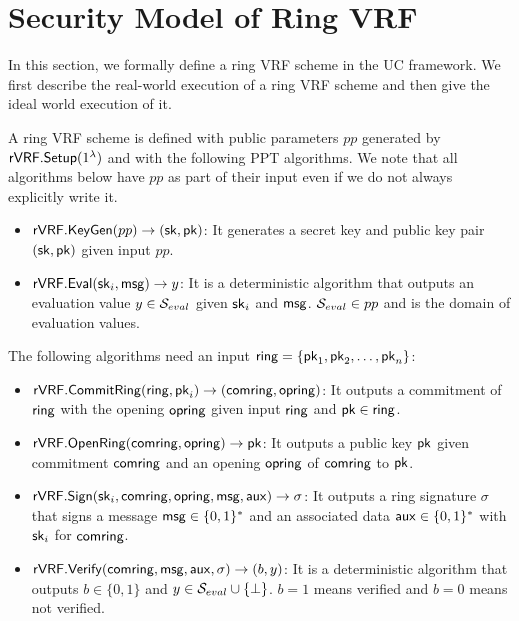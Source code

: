 


\section{Security Model  of Ring VRF}

In this section, we formally define a ring VRF scheme in the UC framework. We first describe the real-world execution of a ring VRF scheme and then give the ideal world execution of it.

\begin{definition} \label{def:ringVRF}	A ring VRF scheme is defined with public parameters $ pp $ generated by  $ {\mathsf{rVRF}}.{\mathsf{Setup}}(1^\lambda) $ and with the following  PPT algorithms. We note that  all algorithms below have $ pp $ as part of their input even if we do not always explicitly write it.
	
	\begin{itemize}
		\item $ {\mathsf{rVRF}}.{\mathsf{KeyGen}}(pp) \rightarrow (\mathsf{sk},\mathsf{pk})$: It generates a secret key and public key pair $ (\mathsf{sk},\mathsf{pk}) $ given input $ pp $.
		\item $ {\mathsf{rVRF}}.{\mathsf{Eval}}(\mathsf{sk}_i, \mathsf{msg}) \rightarrow y$: It is a deterministic algorithm that outputs an evaluation value $ y \in {\ensuremath{\mathcal{S}}}_{eval}$ given  $ \mathsf{sk}_i $ and $ \mathsf{msg} $. $ {\mathcal{S}}_{eval} \in pp$ and is the domain  of  evaluation values.
	\end{itemize}
	The following algorithms need an input $ \mathsf{ring} = \{ \mathsf{pk}_1, \mathsf{pk}_2, \ldots, \mathsf{pk}_n \}$:
	\begin{itemize}
		\item $ {\mathsf{rVRF}}.{\mathsf{CommitRing}}(\mathsf{ring}, \mathsf{pk}_i)  \rightarrow (\mathsf{comring}, \mathsf{opring})$: It  outputs a commitment of $ \mathsf{ring} $ with the opening $ \mathsf{opring} $ given input  $ \mathsf{ring} $ and $ \mathsf{pk} \in \mathsf{ring} $.
		\item $ {\mathsf{rVRF}}.{\mathsf{OpenRing}}(\mathsf{comring},\mathsf{opring}) \rightarrow \mathsf{pk} $: It  outputs a public key $ \mathsf{pk}  $ given commitment $ \mathsf{comring} $ and an opening $ \mathsf{opring} $ of $\mathsf{comring}$ to $\mathsf{pk}$.
		\item $ {\mathsf{rVRF}}.{\mathsf{Sign}}(\mathsf{sk}_i, \mathsf{comring},\mathsf{opring}, \mathsf{msg}, \mathsf{aux})\rightarrow \sigma$: It  outputs a ring signature  $\sigma $  that signs a message $ \mathsf{msg} \in \{0,1\}^* $ and an associated data $ \mathsf{aux} \in \{0,1\}^*$ with $ \mathsf{sk}_i$ for $ \mathsf{comring} $.
		\item $ {\mathsf{rVRF}}.{\mathsf{Verify}}(\mathsf{comring},\mathsf{msg},\mathsf{aux},\sigma) \rightarrow  (b, y)$: It is a deterministic  algorithm that outputs  $ b \in \{0,1\} $ and $ y \in{\ensuremath{\mathcal{S}}}_{eval}\cup \{\perp\} $. $ b =1 $ means verified and $ b = 0 $ means not verified.
	\end{itemize}
	
\end{definition}



